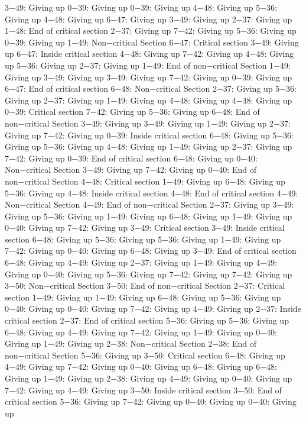 3−49: Giving up
0−39: Giving up
0−39: Giving up
4−48: Giving up
5−36: Giving up
4−48: Giving up
6−47: Giving up
3−49: Giving up
2−37: Giving up
1−48: End of critical section
2−37: Giving up
7−42: Giving up
5−36: Giving up
0−39: Giving up
1−49: Non−critical Section
6−47: Critical section
3−49: Giving up
6−47: Inside critical section
4−48: Giving up
7−42: Giving up
4−48: Giving up
5−36: Giving up
2−37: Giving up
1−49: End of non−critical Section
1−49: Giving up
3−49: Giving up
3−49: Giving up
7−42: Giving up
0−39: Giving up
6−47: End of critical section
6−48: Non−critical Section
2−37: Giving up
5−36: Giving up
2−37: Giving up
1−49: Giving up
4−48: Giving up
4−48: Giving up
0−39: Critical section
7−42: Giving up
5−36: Giving up
6−48: End of non−critical Section
3−49: Giving up
3−49: Giving up
1−49: Giving up
2−37: Giving up
7−42: Giving up
0−39: Inside critical section
6−48: Giving up
5−36: Giving up
5−36: Giving up
4−48: Giving up
1−49: Giving up
2−37: Giving up
7−42: Giving up
0−39: End of critical section
6−48: Giving up
0−40: Non−critical Section
3−49: Giving up
7−42: Giving up
0−40: End of non−critical Section
4−48: Critical section
1−49: Giving up
6−48: Giving up
5−36: Giving up
4−48: Inside critical section
4−48: End of critical section
4−49: Non−critical Section
4−49: End of non−critical Section
2−37: Giving up
3−49: Giving up
5−36: Giving up
1−49: Giving up
6−48: Giving up
1−49: Giving up
0−40: Giving up
7−42: Giving up
3−49: Critical section
3−49: Inside critical section
6−48: Giving up
5−36: Giving up
5−36: Giving up
1−49: Giving up
7−42: Giving up
0−40: Giving up
6−48: Giving up
3−49: End of critical section
6−48: Giving up
4−49: Giving up
2−37: Giving up
1−49: Giving up
4−49: Giving up
0−40: Giving up
5−36: Giving up
7−42: Giving up
7−42: Giving up
3−50: Non−critical Section
3−50: End of non−critical Section
2−37: Critical section
1−49: Giving up
1−49: Giving up
6−48: Giving up
5−36: Giving up
0−40: Giving up
0−40: Giving up
7−42: Giving up
4−49: Giving up
2−37: Inside critical section
2−37: End of critical section
5−36: Giving up
5−36: Giving up
6−48: Giving up
4−49: Giving up
7−42: Giving up
1−49: Giving up
0−40: Giving up
1−49: Giving up
2−38: Non−critical Section
2−38: End of non−critical Section
5−36: Giving up
3−50: Critical section
6−48: Giving up
4−49: Giving up
7−42: Giving up
0−40: Giving up
6−48: Giving up
6−48: Giving up
1−49: Giving up
2−38: Giving up
4−49: Giving up
0−40: Giving up
7−42: Giving up
4−49: Giving up
3−50: Inside critical section
3−50: End of critical section
5−36: Giving up
7−42: Giving up
0−40: Giving up
0−40: Giving up
